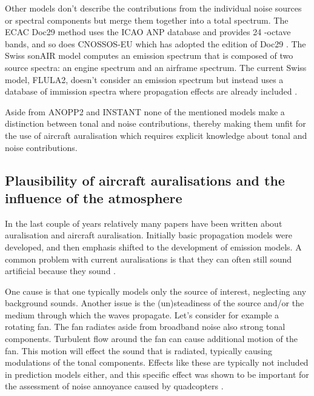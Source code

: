 
Other models don't describe the contributions from the individual noise
sources or spectral components but merge them together into a total spectrum.
The ECAC Doc29 method \cite{Doc29_fourth_2016} uses the ICAO ANP database and
provides 24 -octave bands, and so does CNOSSOS-EU which has
adopted the  edition of Doc29 \cite{Doc29_third_2005}. The Swiss sonAIR
model \cite{Zellmann2016} computes an emission spectrum that is composed of two
source spectra: an engine spectrum and an airframe spectrum. The current Swiss
model, FLULA2, doesn't consider an emission spectrum but instead uses a database
of immission spectra where propagation effects are already included
\cite{EMPA2010,Schaffer2014}.

Aside from ANOPP2 and INSTANT none of the mentioned models make a distinction
between tonal and noise contributions, thereby making them unfit for the use of
aircraft auralisation which requires explicit knowledge about tonal and noise
contributions.

\subsection{Plausibility of aircraft auralisations and the influence of the atmosphere}
In the last couple of years relatively many papers have been written about
auralisation and aircraft auralisation. Initially basic propagation models were
developed, and then emphasis shifted to the development of emission models. A
common problem with current auralisations is that they can often still sound
artificial because they sound .

One cause is that one typically models only the source of interest, neglecting
any background sounds. Another issue is the (un)steadiness of the source and/or
the medium through which the waves propagate. Let's consider for example a
rotating fan. The fan radiates aside from broadband noise also strong tonal
components. Turbulent flow around the fan can cause additional motion of the
fan. This motion will effect the sound that is radiated, typically causing
modulations of the tonal components. Effects like these are typically not
included in prediction models either, and this specific effect was shown to be
important for the assessment of noise annoyance caused by quadcopters
\cite{Rizzi2015}.

